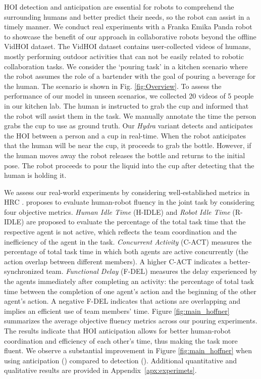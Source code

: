 \documentclass{article}
\begin{document}
HOI detection and anticipation are essential for robots to comprehend the surrounding humans and better predict their needs, so the robot can assist in a timely manner.  We conduct real experiments with a Franka Emika Panda robot to showcase the benefit of our approach in collaborative robots beyond the offline VidHOI dataset.  The VidHOI dataset contains user-collected videos of humans, mostly performing outdoor activities that can not be easily related to robotic collaboration tasks. We consider the `pouring task' in a kitchen scenario where the robot assumes the role of a bartender with the goal of pouring a beverage for the human. The scenario is shown in Fig. \ref{fig:Overview}. To assess the performance of our model in unseen scenarios, we collected 20 videos of 5 people in our kitchen lab. The human is instructed to grab the cup and informed that the robot will assist them in the task. We manually annotate the time the person grabs the cup to use as ground truth. Our \textit{Hydra} variant detects and anticipates the HOI between a person and a cup in real-time. When the robot anticipates that the human will be near the cup, it proceeds to grab the bottle. However, if the human moves away the robot releases the bottle and returns to the initial pose. The robot proceeds to pour the liquid into the cup after detecting that the human is holding it. 

We assess our real-world experiments by considering well-established metrics in HRC \citep{GARCIA2020315}. \citep{GARCIA2020315} proposes to evaluate human-robot fluency in the joint task by considering four objective metrics. \textit{Human Idle Time} (H-IDLE) and \textit{Robot Idle Time} (R-IDLE) are proposed to evaluate the percentage of the total task time that the respective agent is not active, which reflects the team coordination and the inefficiency of the agent in the task.  \textit{Concurrent Activity} (C-ACT) measures the percentage of total task time in which both agents are active concurrently (the action overlap between different members). A higher  C-ACT indicates a better-synchronized team. \textit{Functional Delay} (F-DEL) measures the delay experienced by the agents immediately after completing an activity: the percentage of total task time between the completion of one agent's action and the beginning of the other agent's action. A negative F-DEL indicates that actions are overlapping and implies an efficient use of team members' time. Figure \ref{fig:main_hoffner} summarizes the average objective fluency metrics across our pouring experiments. The results indicate that HOI anticipation allows for better human-robot coordination and efficiency of each other's time, thus making the task more fluent. We observe a substantial improvement in Figure \ref{fig:main_hoffner} when using anticipation () compared to detection (). Additional quantitative and qualitative results are provided in Appendix~\ref{apx:experimets}.
\end{document}
